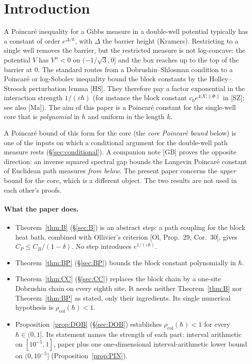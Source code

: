 \documentclass[11pt,a4paper]{article}
\theoremstyle{definition}
\theoremstyle{remark}
\newcommand{\rcol}{\rho_{\mathrm{col}}}
\begin{document}
\section{Introduction}\label{sec:intro}

A Poincar\'e inequality for a Gibbs measure in a double-well potential typically has a constant of order $e^{\Delta/\hbar}$, with $\Delta$ the barrier height (Kramers). Restricting to a single well removes the barrier, but the restricted measure is not log-concave: the potential $V$ has $V''<0$ on $(-1/\sqrt3,0]$ and the box reaches up to the top of the barrier at $0$. The standard routes from a Dobrushin--Shlosman condition to a Poincar\'e or log-Sobolev inequality bound the block constants by the Holley--Stroock perturbation lemma [HS]. They therefore pay a factor exponential in the interaction strength $1/(\varepsilon\hbar)$ (for instance the block constant $c_0e^{4|X|\|\Phi\|}$ in [SZ]; see also [Ma]). The aim of this paper is a Poincar\'e constant for the single-well core that is \emph{polynomial} in $\hbar$ and uniform in the length $k$.

A Poincar\'e bound of this form for the core (the \emph{core Poincar\'e bound} below) is one of the inputs on which a conditional argument for the double-well path measure rests (\S\ref{sec:conditional}). A companion note [GB] proves the opposite direction: an inverse squared spectral gap bounds the Langevin Poincar\'e constant of Euclidean path measures \emph{from below}. The present paper concerns the \emph{upper} bound for the core, which is a different object. The two results are not used in each other's proofs.

\paragraph{What the paper does.}
\begin{itemize}[leftmargin=*]
\item Theorem~\ref{thm:B} (\S\ref{sec:B}) is an abstract step: a path coupling for the block heat bath, combined with Ollivier's criterion [Ol, Prop.~29, Cor.~30], gives $C_P\le C_B/(1-\delta)$. No step introduces $e^{1/(\varepsilon\hbar)}$.
\item Theorem~\ref{thm:BP} (\S\ref{sec:BP}) bounds the block constant polynomially in $\hbar$.
\item Theorem~\ref{thm:CC} (\S\ref{sec:CC}) replaces the block chain by a one-site Dobrushin chain on every eighth site. It needs neither Theorem~\ref{thm:B} nor Theorem~\ref{thm:BP} as stated, only their ingredients. Its single numerical hypothesis is $\rcol(\hbar)<1$.
\item Proposition~\ref{prop:DOB} (\S\ref{sec:DOB}) establishes $\rcol(\hbar)<1$ for every $\hbar\in(0,1]$. Its statement names the strength of each part: interval arithmetic on $[10^{-5},1]$, paper plus one one-dimensional interval-arithmetic lower bound on $(0,10^{-5}]$ (Proposition~\ref{prop:PIN}).
\end{itemize}
\end{document}
